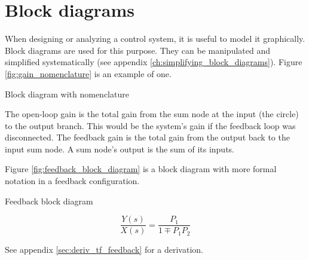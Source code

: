 \section{Block diagrams}

When designing or analyzing a \gls{control system}, it is useful to model it
graphically. Block diagrams are used for this purpose. They can be manipulated
and simplified systematically (see appendix
\ref{ch:simplifying_block_diagrams}). Figure \ref{fig:gain_nomenclature} is an
example of one.

\begin{bookfigure}

  \caption{Block diagram with nomenclature}
  \label{fig:gain_nomenclature}
\end{bookfigure}

The \gls{open-loop gain} is the total gain from the sum node at the input (the
circle) to the output branch. This would be the \gls{system}'s gain if the
feedback loop was disconnected. The \gls{feedback gain} is the total gain from
the output back to the input sum node. A sum node's output is the sum of its
inputs.

Figure \ref{fig:feedback_block_diagram} is a block diagram with more formal
notation in a feedback configuration.

\begin{bookfigure}

  \caption{Feedback block diagram}
  \label{fig:feedback_block_diagram}
\end{bookfigure}

\begin{theorem}
  \begin{equation}
    \frac{Y(s)}{X(s)} = \frac{P_1}{1 \mp P_1 P_2}
  \end{equation}
\end{theorem}

See appendix \ref{sec:deriv_tf_feedback} for a derivation.
